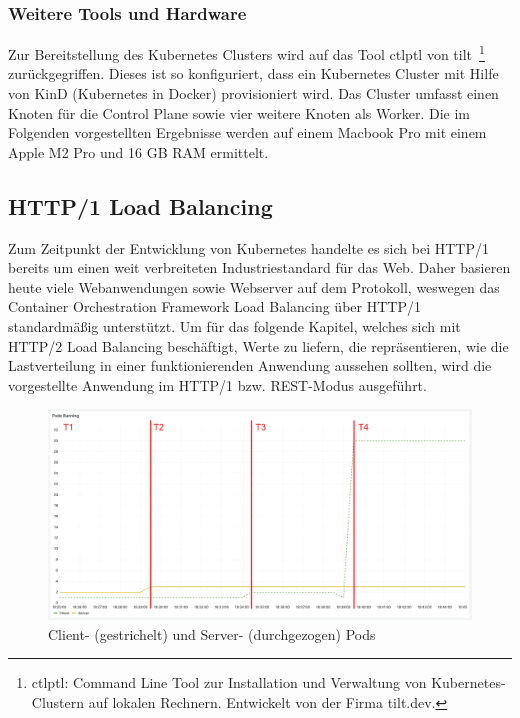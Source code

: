 \subsubsection{Weitere Tools und Hardware}
Zur Bereitstellung des Kubernetes Clusters wird auf das Tool ctlptl von tilt~\footnote{ctlptl: Command Line Tool zur Installation und Verwaltung von Kubernetes-Clustern auf lokalen Rechnern. Entwickelt von der Firma tilt.dev.} zu\-rück\-ge\-grif\-fen.
Dieses ist so konfiguriert, dass ein Kubernetes Cluster mit Hilfe von KinD (Kubernetes in Docker) provisioniert wird.
Das Cluster umfasst einen Knoten für die Control Plane sowie vier weitere Knoten als Worker.
Die im Folgenden vorgestellten Ergebnisse werden auf einem Macbook Pro mit einem Apple M2 Pro und 16 GB RAM ermittelt.

\newpage

\subsection{HTTP/1 Load Balancing}\label{subsec:http/1-load-balancing}
Zum Zeitpunkt der Entwicklung von Kubernetes handelte es sich bei HTTP/1 bereits um einen weit verbreiteten Industriestandard für das Web.
Daher basieren heute viele Webanwendungen sowie Webserver auf dem Protokoll, weswegen das Container Orchestration Framework Load Balancing über HTTP/1 standardmäßig unterstützt.
Um für das folgende Kapitel, welches sich mit HTTP/2 Load Balancing beschäftigt, Werte zu liefern, die repräsentieren, wie die Lastverteilung in einer funktionierenden Anwendung aussehen sollten, wird die vorgestellte Anwendung im HTTP/1 bzw. REST-Modus ausgeführt.
\begin{figure}[H]
    \centering
    \includegraphics[width=1\textwidth]{img/rest_pods}
    \caption{Client- (gestrichelt) und Server- (durchgezogen) Pods}
    \label{fig:rest_pods}
\end{figure}

